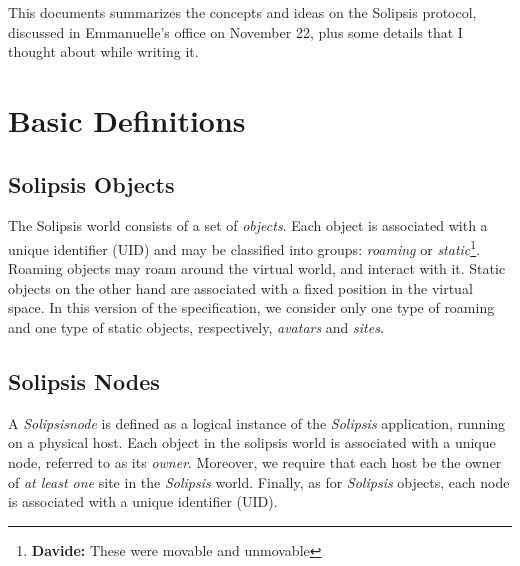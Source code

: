 \documentclass{article}
\newcommand{\df}[1]{\footnote{\textbf{Davide: }#1}}
\newcommand{\sol}{\emph{Solipsis}\xspace}
\begin{document}
This documents summarizes the concepts and ideas on the Solipsis
protocol, discussed in Emmanuelle's office on November 22, plus some
details that I thought about while writing it.

\section{Basic Definitions}


\subsection{Solipsis Objects}
The Solipsis world consists of a set of \emph{objects}. Each object is
associated with a unique identifier (UID) and may be classified into
groups: \emph{roaming} or \emph{static}\df{These were movable and
  unmovable}. Roaming objects may roam around the virtual world, and
interact with it. Static objects on the other hand are associated with
a fixed position in the virtual space. In this version of the
specification, we consider only one type of roaming and one type of
static objects, respectively, \emph{avatars} and \emph{sites}.







\subsection{Solipsis Nodes}
A \sol \emph{node} is defined as a logical instance of the \sol
application, running on a physical host. Each object in the solipsis
world is associated with a unique node, referred to as its
\emph{owner}. Moreover, we require that each host be the owner of
\emph{at least one} site in the \sol world.  Finally, as for \sol
objects, each node is associated with a unique identifier (UID).
\end{document}
